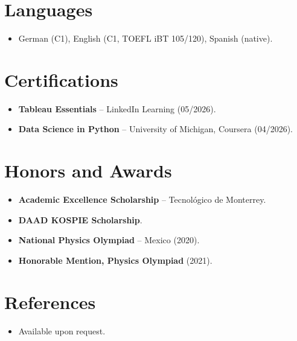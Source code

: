 \documentclass[11pt,a4paper,sans]{moderncv}
\begin{document}

\section{Languages}
\vspace{1pt}
\begin{itemize}
\item German (C1), English (C1, TOEFL iBT 105/120), Spanish (native).
\end{itemize}


\section{Certifications}
\vspace{1pt}
\begin{itemize}
\item{\textbf{Tableau Essentials} -- LinkedIn Learning (05/2026).}
\item{\textbf{Data Science in Python} -- University of Michigan, Coursera (04/2026).}
\end{itemize}


\section{Honors and Awards}
\vspace{1pt}
\begin{itemize}
\item{\textbf{Academic Excellence Scholarship} -- Tecnológico de Monterrey.}
\item{\textbf{DAAD KOSPIE Scholarship}.}
\item{\textbf{National Physics Olympiad} -- Mexico (2020).}
\item{\textbf{Honorable Mention, Physics Olympiad} (2021).}
\end{itemize}


\section{References}
\vspace{1pt}
\begin{itemize}
\item{Available upon request.}
\end{itemize}
\end{document}
